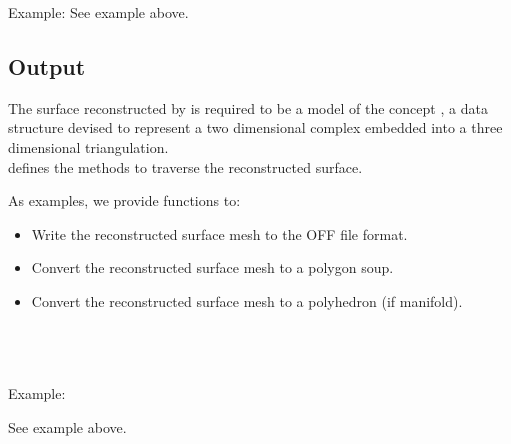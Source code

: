 Example:
See  example above.


\subsection{Output}

The surface reconstructed by  is required to be a model of the concept , a data structure devised to represent a two dimensional complex embedded into a three dimensional triangulation.\\

 defines the methods to traverse the reconstructed surface.

As examples, we provide functions to:

\begin{itemize}
\item Write the reconstructed surface mesh to the OFF file format.
\item Convert the reconstructed surface mesh to a polygon soup.
\item Convert the reconstructed surface mesh to a polyhedron (if manifold).
\end{itemize}

  \\
  \\
  \\

Example:

See  example above.
